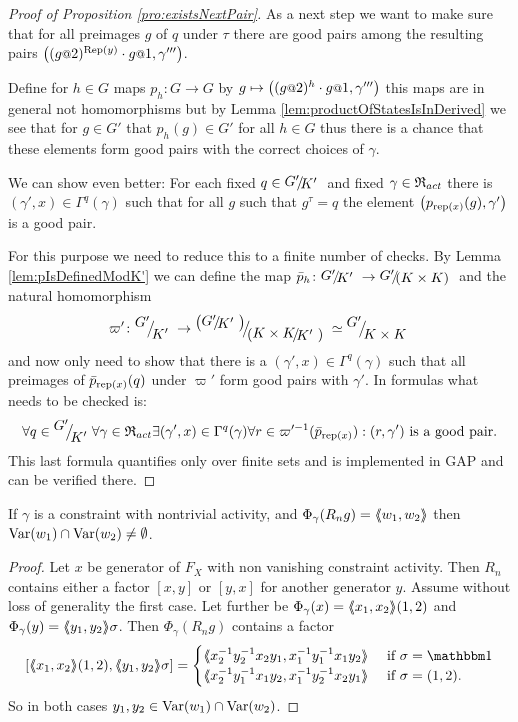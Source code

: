 \documentclass[a4paper,12pt]{article}
\begin{document}
\begin{proof}[Proof of Proposition \ref{pro:existsNextPair}]
 As a next step we want to make sure that for all preimages $g$ of $q$ under $\tau$ there are good pairs among the
 resulting pairs $\left((g\at{2})^{\textup{Rep}(y)}\cdot g\at{1},\gamma'''\right)$.
 
  Define for $h\in G$ maps $p_h\colon G\to G$ by $g\mapsto \left((g\at{2})^{h}\cdot g\at{1},\gamma'''\right)$ this maps are in general not homomorphisms but 
  by Lemma \ref{lem:productOfStatesIsInDerived} we see that for $g\in G'$ that $p_h(g)\in G'$ for all $h\in G$ thus there is a chance that these elements form good pairs with
 the correct choices of $\gamma$. 
 
 We can show even better: For each fixed $q\in\RNK{G'}{K'}$ and fixed $\gamma\in\mathfrak{R}_{act}$ there is $(\gamma',x)\in\Gamma^q(\gamma)$ such that 
 for all $g$ such that $g^\tau=q$ the element $\left(p_{\textup{rep}(x)}(g),\gamma'\right)$ is a good pair. 
 
 For this purpose we need to reduce this to a finite number of checks. By Lemma \ref{lem:pIsDefinedModK'} we can define the map $\bar p_h\colon \RNK{G'}{K'} \to \RNK{G'}{(K\times K)}$
 and the natural homomorphism \[\varpi'\colon \RNK{G'}{K'} \to \RNK{\left(\RNK{G'}{K'}\right)}{\left(\RNK{K\times K}{K'}\right)} \simeq \RNK{G'}{K\times K} \]
 and now only need to show that there is a $(\gamma',x)\in\Gamma^q(\gamma)$ such that all preimages of $\bar p_{\textup{rep}(x)}(q)$ under $\varpi'$ 
 form good pairs with $\gamma'$. In formulas what needs to be checked is: 
 \[\forall q\in\RNK{G'}{K'}\forall \gamma\in\Red_{act} \exists (\gamma',x)\in \Gamma^q(\gamma)\forall r\in \varpi'^{-1}(\bar p_{\textup{rep}(x)}): (r,\gamma')\textup{ is a good pair.}\]
 This last formula quantifies only over finite sets and is implemented in GAP and can be verified there.
\end{proof}
\begin{lem} \label{lem:commonVar}
 If $\gamma$ is a constraint with nontrivial activity, and $\Phi_\gamma(R_ng)=\langle\negthickspace\langle w_1,w_2\rangle\negthickspace\rangle$ then $\textup{Var}(w_1)\cap\textup{Var}(w_2)\neq \emptyset$.
\end{lem}
\begin{proof}
 Let $x$ be generator of $F_X$ with non vanishing constraint activity. 
 Then $R_n$ contains either a factor $[x,y]$ or $[y,x]$ for another generator $y$. Assume without loss of generality the first case.
 Let further be $\Phi_\gamma(x)=\langle\negthickspace\langle x_1,x_2\rangle\negthickspace\rangle(1,2)$ and $\Phi_\gamma(y)=\langle\negthickspace\langle y_1,y_2\rangle\negthickspace\rangle\sigma$. 
 Then $\Phi_\gamma(R_n g)$ contains a factor 
 \[ [\pair{x_1,x_2}(1,2),\pair{y_1,y_2}\sigma] = \begin{cases}
                                                   \pair{x_2^{-1}y_2^{-1}x_2y_1,x_1^{-1}y_1^{-1}x_1y_2} & \textup{ if } \sigma=\id \\
                                                   \pair{x_2^{-1}y_1^{-1}x_1y_2,x_1^{-1}y_2^{-1}x_2y_1} & \textup{ if } \sigma=(1,2) . \\
                                                 \end{cases}
\] So in both cases $y_1,y_2\in \textup{Var}(w_1)\cap \textup{Var}(w_2)$. 
\end{proof}
\end{document}
